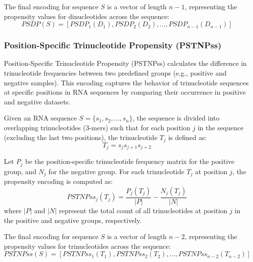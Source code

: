       The final encoding for sequence $S$ is a vector of length $n-1$, representing the propensity values for dinucleotides across the sequence:
      \[
        PSDP(S) = [PSDP_1(D_1), PSDP_2(D_2), \dots, PSDP_{n-1}(D_{n-1})]
      \]

    \subsubsection{Position-Specific Trinucleotide Propensity (PSTNPss)}\label{subsubsec:pstnpss}
      Position-Specific Trinucleotide Propensity (PSTNPss) calculates the difference in trinucleotide frequencies between two predefined groups (e.g., positive and negative samples).
      This encoding captures the behavior of trinucleotide sequences at specific positions in RNA sequences by comparing their occurrence in positive and negative datasets.

      Given an RNA sequence $S = \{s_1, s_2, \dots, s_n\}$, the sequence is divided into overlapping trinucleotides (3-mers) such that for each position $j$ in the sequence (excluding the last two positions), the trinucleotide $T_j$ is defined as:
      \[
        T_j = s_j s_{j+1} s_{j+2}
      \]

      Let $P_j$ be the position-specific trinucleotide frequency matrix for the positive group, and $N_j$ for the negative group.
      For each trinucleotide $T_j$ at position $j$, the propensity encoding is computed as:
      \[
        PSTNPss_j(T_j) = \frac{P_j(T_j)}{|P|} - \frac{N_j(T_j)}{|N|}
      \]
      where $|P|$ and $|N|$ represent the total count of all trinucleotides at position $j$ in the positive and negative groups, respectively.

      The final encoding for sequence $S$ is a vector of length $n-2$, representing the propensity values for trinucleotides across the sequence:
      \[
        PSTNPss(S) = [PSTNPss_1(T_1), PSTNPss_2(T_2), \dots, PSTNPss_{n-2}(T_{n-2})]
      \]
